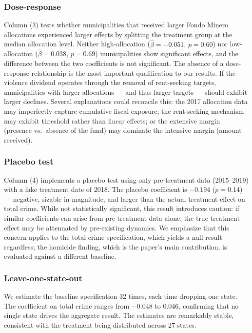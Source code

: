 \documentclass[12pt]{article}
\begin{document}
\subsubsection*{Dose-response} Column (3) tests whether municipalities that received larger Fondo Minero allocations experienced larger effects by splitting the treatment group at the median allocation level. Neither high-allocation ($\hat{\beta} = -0.051$, $p = 0.60$) nor low-allocation ($\hat{\beta} = 0.038$, $p = 0.69$) municipalities show significant effects, and the difference between the two coefficients is not significant. The absence of a dose-response relationship is the most important qualification to our results. If the violence dividend operates through the removal of rent-seeking targets, municipalities with larger allocations --- and thus larger targets --- should exhibit larger declines. Several explanations could reconcile this: the 2017 allocation data may imperfectly capture cumulative fiscal exposure; the rent-seeking mechanism may exhibit threshold rather than linear effects; or the extensive margin (presence vs.\ absence of the fund) may dominate the intensive margin (amount received).

\subsubsection*{Placebo test} Column (4) implements a placebo test using only pre-treatment data (2015--2019) with a fake treatment date of 2018. The placebo coefficient is $-0.194$ ($p = 0.14$) --- negative, sizable in magnitude, and larger than the actual treatment effect on total crime. While not statistically significant, this result introduces caution: if similar coefficients can arise from pre-treatment data alone, the true treatment effect may be attenuated by pre-existing dynamics. We emphasize that this concern applies to the total crime specification, which yields a null result regardless; the homicide finding, which is the paper's main contribution, is evaluated against a different baseline.

\subsubsection*{Leave-one-state-out} We estimate the baseline specification 32 times, each time dropping one state. The coefficient on total crime ranges from $-0.048$ to $0.046$, confirming that no single state drives the aggregate result. The estimates are remarkably stable, consistent with the treatment being distributed across 27 states.
\end{document}
